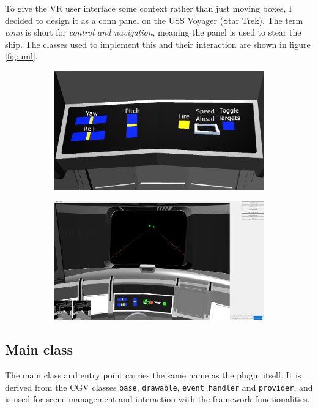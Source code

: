 \documentclass[hyperref, bachelorofscience]{cgvpub}
\begin{document}
To give the VR user interface some context rather than just moving boxes, I decided to design it as a conn panel on the USS Voyager (Star Trek). The term \emph{conn} is short for \emph{control and navigation}, meaning the panel is used to stear the ship. The classes used to implement this and their interaction are shown in figure \ref{fig:uml}.

\begin{figure}
	\begin{subfigure}{.49\linewidth}
		\includegraphics[width=\linewidth]{../pics/panel}
		\label{fig:panel}
	\end{subfigure}
	\hfill
	\begin{subfigure}{.49\linewidth}
		\includegraphics[width=\linewidth]{../pics/firing}
		\label{fig:firing}
	\end{subfigure}
\end{figure}

\subsection{Main class}
The main class and entry point carries the same name as the plugin itself. It is derived from the \gls{CGV} classes \lstinline|base|, \lstinline|drawable|, \lstinline|event_handler| and \lstinline|provider|, and is used for scene management and interaction with the framework functionalities.
\end{document}
